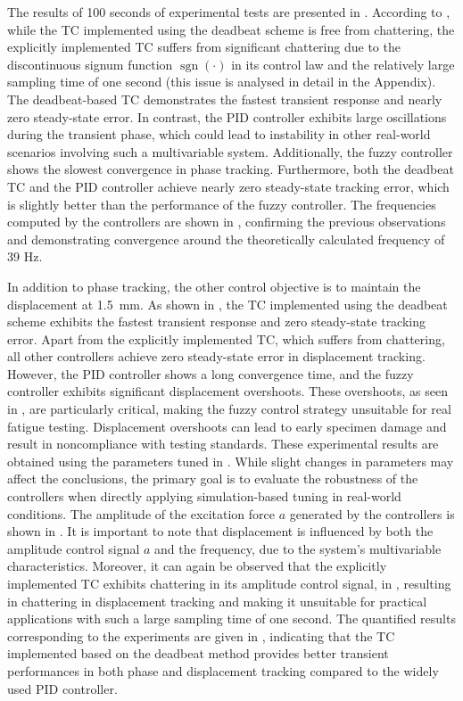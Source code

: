 \documentclass[preprint,12pt]{elsarticle}
\DeclareMathOperator{\sgn}{sgn}
\begin{document}
The results of 100 seconds of experimental tests are presented in . According to , while the TC implemented using the deadbeat scheme is free from chattering, the explicitly implemented TC suffers from significant chattering due to the discontinuous signum function $\sgn(\cdot)$ in its control law and the relatively large sampling time of one second (this issue is analysed in detail in the Appendix). The deadbeat-based TC demonstrates the fastest transient response and nearly zero steady-state error. In contrast, the PID controller exhibits large oscillations during the transient phase, which could lead to instability in other real-world scenarios involving such a multivariable system. Additionally, the fuzzy controller shows the slowest convergence in phase tracking. Furthermore, both the deadbeat TC and the PID controller achieve nearly zero steady-state tracking error, which is slightly better than the performance of the fuzzy controller. The frequencies computed by the controllers are shown in , confirming the previous observations and demonstrating convergence around the theoretically calculated frequency of 39 Hz.

In addition to phase tracking, the other control objective is to maintain the displacement at 1.5~mm. As shown in , the TC implemented using the deadbeat scheme exhibits the fastest transient response and zero steady-state tracking error. Apart from the explicitly implemented TC, which suffers from chattering, all other controllers achieve zero steady-state error in displacement tracking. However, the PID controller shows a long convergence time, and the fuzzy controller exhibits significant displacement overshoots. These overshoots, as seen in , are particularly critical, making the fuzzy control strategy unsuitable for real fatigue testing. Displacement overshoots can lead to early specimen damage and result in noncompliance with testing standards.
These experimental results are obtained using the parameters tuned in . While slight changes in parameters may affect the conclusions, the primary goal is to evaluate the robustness of the controllers when directly applying simulation-based tuning in real-world conditions. The amplitude of the excitation force $a$ generated by the controllers is shown in . It is important to note that displacement is influenced by both the amplitude control signal $a$ and the frequency, due to the system’s multivariable characteristics. Moreover, it can again be observed that the explicitly implemented TC exhibits chattering in its amplitude control signal, in , resulting in chattering in displacement tracking and making it unsuitable for practical applications with such a large sampling time of one second.
The quantified results corresponding to the experiments are given in , indicating that the TC implemented based on the deadbeat method provides better transient performances in both phase and displacement tracking compared to the widely used PID controller.
\end{document}
